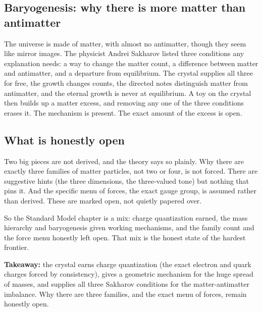 \subsection{Baryogenesis: why there is more matter than antimatter}

The universe is made of matter, with almost no antimatter, though they seem like mirror images. The physicist Andrei Sakharov listed three conditions any explanation needs: a way to change the matter count, a difference between matter and antimatter, and a departure from equilibrium. The crystal supplies all three for free, the growth changes counts, the directed notes distinguish matter from antimatter, and the eternal growth is never at equilibrium. A toy on the crystal then builds up a matter excess, and removing any one of the three conditions erases it. The mechanism is present. The exact amount of the excess is open.

\subsection{What is honestly open}

Two big pieces are not derived, and the theory says so plainly. Why there are exactly three families of matter particles, not two or four, is not forced. There are suggestive hints (the three dimensions, the three-valued tone) but nothing that pins it. And the specific menu of forces, the exact gauge group, is assumed rather than derived. These are marked open, not quietly papered over.

So the Standard Model chapter is a mix: charge quantization earned, the mass hierarchy and baryogenesis given working mechanisms, and the family count and the force menu honestly left open. That mix is the honest state of the hardest frontier.

\textbf{Takeaway:} the crystal earns charge quantization (the exact electron and quark charges forced by consistency), gives a geometric mechanism for the huge spread of masses, and supplies all three Sakharov conditions for the matter-antimatter imbalance. Why there are three families, and the exact menu of forces, remain honestly open.
